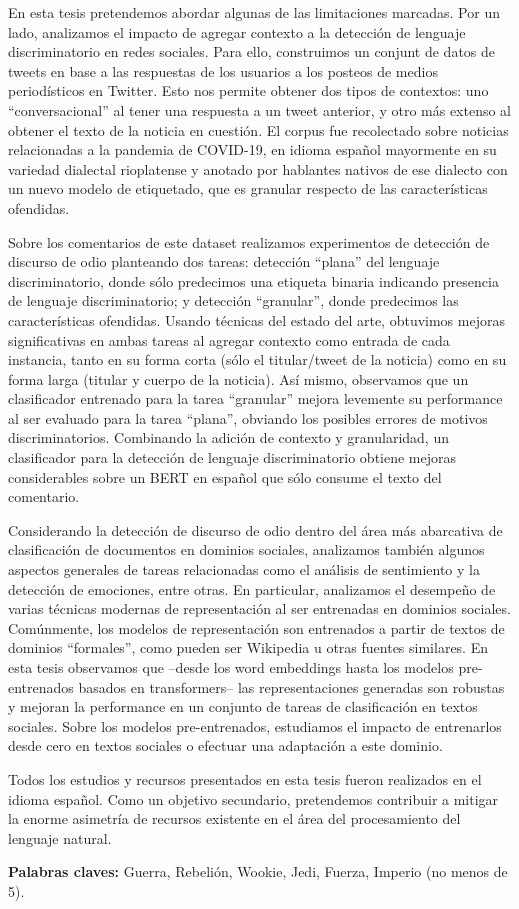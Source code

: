 En esta tesis pretendemos abordar algunas de las limitaciones marcadas. Por un lado, analizamos el impacto de agregar contexto a la detección de lenguaje discriminatorio en redes sociales. Para ello, construimos un conjunt de datos de tweets en base a las respuestas de los usuarios a los posteos de medios periodísticos en Twitter. Esto nos permite obtener dos tipos de contextos: uno “conversacional” al tener una respuesta a un tweet anterior, y otro más extenso al obtener el texto de la noticia en cuestión. El corpus fue recolectado sobre noticias relacionadas a la pandemia de COVID-19, en idioma español mayormente en su variedad dialectal rioplatense y anotado por hablantes nativos de ese dialecto con un nuevo modelo de etiquetado, que es granular respecto de las características ofendidas.

Sobre los comentarios de este dataset realizamos experimentos de detección de discurso de odio planteando dos tareas: detección “plana” del lenguaje discriminatorio, donde sólo predecimos una etiqueta binaria indicando presencia de lenguaje discriminatorio; y detección “granular”, donde predecimos las características ofendidas. Usando técnicas del estado del arte, obtuvimos mejoras significativas en ambas tareas al agregar contexto como entrada de cada instancia, tanto en su forma corta (sólo el titular/tweet de la noticia) como en su forma larga (titular y cuerpo de la noticia). Así mismo, observamos que un clasificador entrenado para la tarea “granular” mejora levemente su performance al ser evaluado para la tarea “plana”, obviando los posibles errores de motivos discriminatorios. Combinando la adición de contexto y granularidad, un clasificador para la detección de lenguaje discriminatorio obtiene mejoras considerables sobre un BERT en español que sólo consume el texto del comentario.

Considerando la detección de discurso de odio dentro del área más abarcativa de clasificación de documentos en dominios sociales, analizamos también algunos aspectos generales de tareas relacionadas como el análisis de sentimiento y la detección de emociones, entre otras. En particular, analizamos el desempeño de varias técnicas modernas de representación al ser entrenadas en dominios sociales. Comúnmente, los modelos de representación son entrenados a partir de textos de dominios “formales”, como pueden ser Wikipedia u otras fuentes similares. En esta tesis observamos que –desde los word embeddings hasta los modelos pre-entrenados basados en transformers– las representaciones generadas son robustas y mejoran la performance en un conjunto de tareas de clasificación en textos sociales. Sobre los modelos pre-entrenados, estudiamos el impacto de entrenarlos desde cero en textos sociales o efectuar una adaptación a este dominio.

Todos los estudios y recursos presentados en esta tesis fueron realizados en el idioma español. Como un objetivo secundario, pretendemos contribuir a mitigar la enorme asimetría de recursos existente en el área del procesamiento del lenguaje natural.





\bigskip

\noindent\textbf{Palabras claves:} Guerra, Rebelión, Wookie, Jedi, Fuerza, Imperio (no menos de 5).